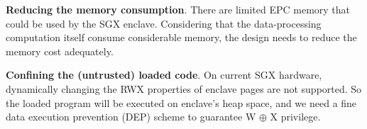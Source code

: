 {\vspace{3pt}\noindent\textbf{Reducing the memory consumption}.\label{challenge-size} 
    There are limited EPC memory that could be used by the SGX enclave. Considering that the data-processing computation itself consume considerable memory, the design needs to reduce the memory cost adequately.

\vspace{3pt}\noindent\textbf{Confining the (untrusted) loaded code}.\label{challenge-dep} On current SGX hardware, dynamically changing the RWX properties of enclave pages are not supported. So the loaded program will be executed on enclave's heap space, and we need a fine data execution prevention (DEP) scheme to guarantee W $\oplus$ X privilege.%


}
